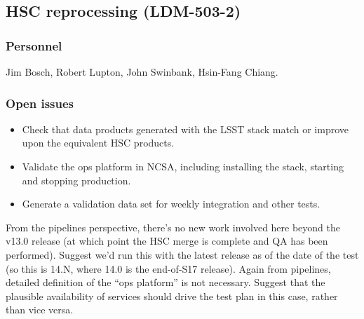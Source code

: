 \subsection{HSC reprocessing \textbf{(LDM-503-2)}\label{LDM-503-2}}
\subsubsection{Personnel}
Jim Bosch, Robert Lupton, John Swinbank, Hsin-Fang Chiang.

\subsubsection{Open issues}

\begin{itemize}

\item{Check that data products generated with the LSST stack match or improve upon the equivalent HSC products.}

\item{Validate the ops platform in NCSA, including installing the stack, starting and stopping production.}

\item{Generate a validation data set for weekly integration and other tests.}

\end{itemize}

From the pipelines perspective, there's no new work involved here beyond the v13.0 release (at which point the HSC merge is complete and QA has been performed). Suggest we'd run this with the latest release as of the date of the test (so this is 14.N, where 14.0 is the end-of-S17 release).
Again from pipelines, detailed definition of the ``ops platform'' is not necessary.
Suggest that the plausible availability of services should drive the test plan in this case, rather than vice versa.


